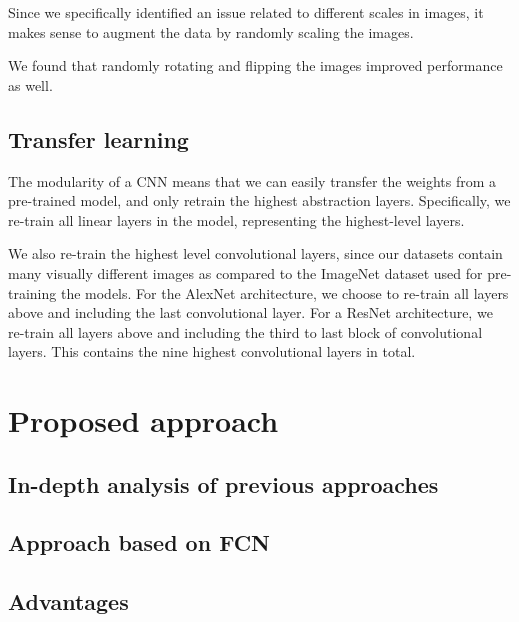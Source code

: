 Since we specifically identified an issue related to different scales
in images, it makes sense to augment the data by randomly scaling the
images. %

We found that randomly rotating and flipping the images improved performance
as well.

\subsection{Transfer learning}
The modularity of a CNN means that we can easily transfer
the weights from a pre-trained model, and only retrain the highest
abstraction layers. Specifically, we re-train all linear layers in the
model, representing the highest-level layers.

We also re-train the highest level convolutional layers, since our datasets
contain many visually different images as compared to the ImageNet
dataset used for pre-training the models.
For the AlexNet architecture, we choose to re-train all layers above
and including the last convolutional layer.
For a ResNet architecture, we re-train all layers above and including the
third to last block of convolutional layers. This contains the
nine highest convolutional layers in total.

\section{Proposed approach}
\subsection{In-depth analysis of previous approaches}
\subsection{Approach based on FCN}
\subsection{Advantages}

